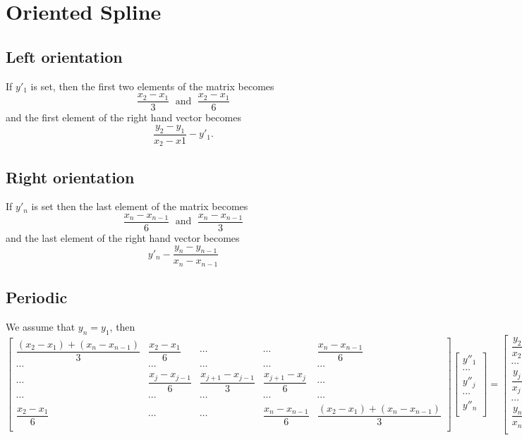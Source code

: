 \documentclass[aps]{revtex4}
\begin{document}
\section{Oriented Spline}
\subsection{Left orientation}
If $y'_1$ is set, then the first two elements of the matrix becomes
$$
	\dfrac{x_2-x_1}{3} \;\text{ and }\; \dfrac{x_2-x_1}{6}
$$
and the first element of the right hand vector becomes
$$
	\dfrac{y_2-y_1}{x_2-x1} - y'_1.
$$
\subsection{Right orientation}
If $y'_n$ is set then the last element of the matrix becomes
$$
	\dfrac{x_n-x_{n-1}}{6}\;\text{ and }\;\dfrac{x_n-x_{n-1}}{3}
$$
and the last element of the right hand vector becomes
$$
	y'_n - \dfrac{y_n-y_{n-1}}{x_n-x_{n-1}}
$$
\subsection{Periodic}
We assume that $y_n=y_1$, then
$$
	\begin{bmatrix}
		\dfrac{\left(x_2-x_1\right)+\left(x_n-x_{n-1}\right)}{3} & \dfrac{x_2-x_1}{6} & \cdots & \cdots & \dfrac{x_n-x_{n-1}}{6}\\
		\cdots & \cdots & \cdots & \cdots & \cdots \\
		\cdots & \dfrac{x_{j}-x_{j-1}}{6} & \dfrac{x_{j+1}-x_{j-1}}{3} & \dfrac{x_{j+1}-x_{j}}{6} & \cdots\\
		\cdots & \cdots & \cdots & \cdots & \cdots \\
		\dfrac{x_2-x_1}{6} & \cdots & \cdots & \dfrac{x_n-x_{n-1}}{6} & \dfrac{\left(x_2-x_1\right)+\left(x_n-x_{n-1}\right)}{3} \\
	\end{bmatrix}
	\begin{bmatrix}
	y''_1\\
	\cdots\\
	y''_j\\
	\cdots\\
	y''_n\\
	\end{bmatrix}
	=
	\begin{bmatrix}
	\dfrac{y_2-y_1}{x_2-x_1}-\dfrac{y_n-y_{n-1}}{x_n-x_{n-1}}\\
	\cdots\\
	\dfrac{y_{j+1}-y_{j}}{x_{j+1}-x_{j}} - \dfrac{y_j-y_{j-1}}{x_j-x_{j-1}}\\
	\cdots\\
	\dfrac{y_n-y_{n-1}}{x_n-x_{n-1}}-\dfrac{y_2-y_1}{x_2-x_1}\\
	\end{bmatrix}
$$
\end{document}
